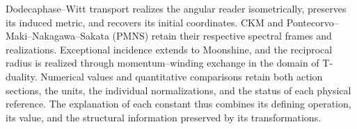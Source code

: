 Dodecaphase--Witt transport realizes the angular reader isometrically,
preserves its induced metric, and recovers its initial coordinates.
CKM and Pontecorvo--Maki--Nakagawa--Sakata (PMNS) retain their respective
spectral frames and realizations.
Exceptional incidence extends to Moonshine, and the reciprocal radius
is realized through momentum--winding exchange in the domain of
T-duality. Numerical values and quantitative comparisons retain both
action sections, the units, the individual normalizations, and the
status of each physical reference. The explanation of each constant
thus combines its defining operation, its value, and the structural
information preserved by its transformations.

\vspace{2pt}

\par\endgroup
